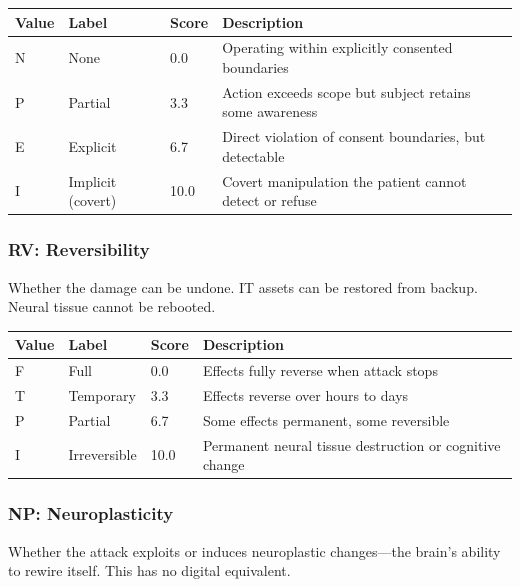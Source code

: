 \begin{table}[H]
\centering
\small
\begin{tabular}{@{}l l l p{7cm}@{}}
\toprule
\textbf{Value} & \textbf{Label} & \textbf{Score} & \textbf{Description} \\
\midrule
N & None              & 0.0  & Operating within explicitly consented boundaries \\
P & Partial           & 3.3  & Action exceeds scope but subject retains some awareness \\
E & Explicit          & 6.7  & Direct violation of consent boundaries, but detectable \\
I & Implicit (covert) & 10.0 & Covert manipulation the patient cannot detect or refuse \\
\bottomrule
\end{tabular}
\end{table}

\subsubsection{RV: Reversibility}

Whether the damage can be undone. IT assets can be restored from backup. Neural
tissue cannot be rebooted.

\begin{table}[H]
\centering
\small
\begin{tabular}{@{}l l l p{7cm}@{}}
\toprule
\textbf{Value} & \textbf{Label} & \textbf{Score} & \textbf{Description} \\
\midrule
F & Full        & 0.0  & Effects fully reverse when attack stops \\
T & Temporary   & 3.3  & Effects reverse over hours to days \\
P & Partial     & 6.7  & Some effects permanent, some reversible \\
I & Irreversible & 10.0 & Permanent neural tissue destruction or cognitive change \\
\bottomrule
\end{tabular}
\end{table}

\subsubsection{NP: Neuroplasticity}

Whether the attack exploits or induces neuroplastic changes---the brain's ability
to rewire itself. This has no digital equivalent.

